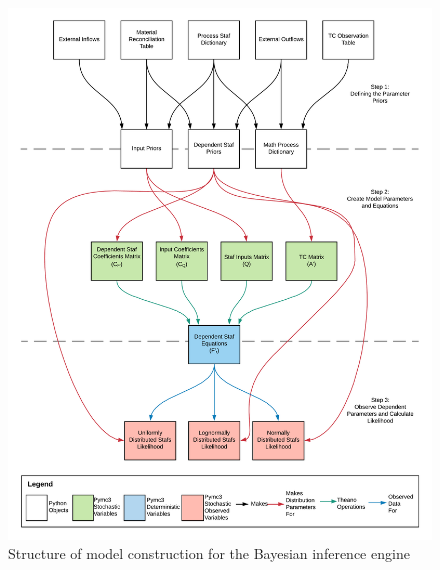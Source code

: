 \documentclass[ %
                    author={Tom Jager},
                supervisor={Dr. Daniel Schien},
                    degree={MEng},
                     title={A Bayesian Inference Engine for UMIS Structured Data},
                  subtitle={},
                      type={research},
                      year={2019} ]{dissertation}
\begin{document}
\begin{figure}
    \centering
    \includegraphics[width=0.9\paperwidth]{images/inference_engine_structure.png}
    \caption{Structure of model construction for the Bayesian inference engine}
    \label{fig:inference_engine_structure}
\end{figure}
\restoregeometry
\end{document}
